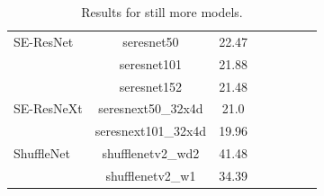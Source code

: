 {\begin{table}[!htb]
\begin{center}
\begin{tabular}{|p{1in}|c|c|c|c|c|c|c|}
\hline
SE-ResNet & seresnet50 & 22.47 & \\
& seresnet101 & 21.88 & \\
& seresnet152 & 21.48 & \\
\hline
SE-ResNeXt & seresnext50\_32x4d & 21.0 & \\
& seresnext101\_32x4d & 19.96 & \\
\hline
ShuffleNet & shufflenetv2\_wd2 & 41.48 & \\
& shufflenetv2\_w1 & 34.39 & \\
\hline
\end{tabular}
\end{center}
\caption{Results for still more models.
        }
\label{table:models_still_more}
\end{table}


}
